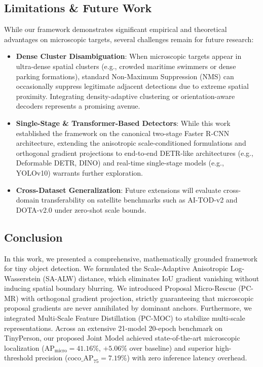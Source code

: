 \subsection{Limitations \& Future Work}
While our framework demonstrates significant empirical and theoretical advantages on microscopic targets, several challenges remain for future research:
\begin{itemize}
    \item \textbf{Dense Cluster Disambiguation}: When microscopic targets appear in ultra-dense spatial clusters (e.g., crowded maritime swimmers or dense parking formations), standard Non-Maximum Suppression (NMS) can occasionally suppress legitimate adjacent detections due to extreme spatial proximity. Integrating density-adaptive clustering or orientation-aware decoders represents a promising avenue.
    \item \textbf{Single-Stage \& Transformer-Based Detectors}: While this work established the framework on the canonical two-stage Faster R-CNN architecture, extending the anisotropic scale-conditioned formulations and orthogonal gradient projections to end-to-end DETR-like architectures (e.g., Deformable DETR, DINO) and real-time single-stage models (e.g., YOLOv10) warrants further exploration.
    \item \textbf{Cross-Dataset Generalization}: Future extensions will evaluate cross-domain transferability on satellite benchmarks such as AI-TOD-v2 and DOTA-v2.0 under zero-shot scale bounds.
\end{itemize}

\subsection{Conclusion}
In this work, we presented a comprehensive, mathematically grounded framework for tiny object detection. We formulated the Scale-Adaptive Anisotropic Log-Wasserstein (SA-ALW) distance, which eliminates IoU gradient vanishing without inducing spatial boundary blurring. We introduced Proposal Micro-Rescue (PC-MR) with orthogonal gradient projection, strictly guaranteeing that microscopic proposal gradients are never annihilated by dominant anchors. Furthermore, we integrated Multi-Scale Feature Distillation (PC-MOC) to stabilize multi-scale representations. Across an extensive 21-model 20-epoch benchmark on TinyPerson, our proposed Joint Model achieved state-of-the-art microscopic localization ($\mathrm{AP}_{\mathrm{micro}} = \mathbf{41.16\%}$, $+5.06\%$ over baseline) and superior high-threshold precision ($\mathrm{coco\_AP}_{75} = \mathbf{7.19\%}$) with zero inference latency overhead.
